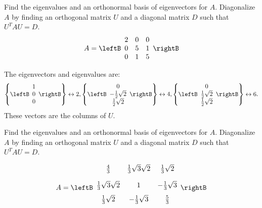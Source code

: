 \begin{enumialphparenastyle}
\begin{ex} Find the eigenvalues and an orthonormal basis of eigenvectors for $A.$
Diagonalize $A$ by finding an orthogonal matrix $U$ and a diagonal matrix $D$
such that $U^{T}AU=D$. 
\begin{equation*}
A=\leftB 
\begin{array}{rrr}
2 & 0 & 0 \\ 
0 & 5 & 1 \\ 
0 & 1 & 5
\end{array}
\rightB 
\end{equation*}
\begin{sol}
The eigenvectors and eigenvalues are:
\[
\left\{ \leftB
\begin{array}{c}
1 \\
0 \\
0
\end{array}
\rightB \right\} \leftrightarrow 2,\left\{ \leftB
\begin{array}{c}
0 \\
-\frac{1}{2}\sqrt{2} \\
\frac{1}{2}\sqrt{2}
\end{array}
\rightB \right\} \leftrightarrow 4,\left\{ \leftB
\begin{array}{c}
0 \\
\frac{1}{2}\sqrt{2} \\
\frac{1}{2}\sqrt{2}
\end{array}
\rightB \right\} \leftrightarrow 6.
\]
These vectors are the columns of $U$.
\end{sol}
\end{ex}

\begin{ex} Find the eigenvalues and an orthonormal basis of eigenvectors for $A.$
Diagonalize $A$ by finding an orthogonal matrix $U$ and a diagonal matrix $D$
such that $U^{T}AU=D$.

\begin{equation*}
A=\leftB 
\begin{array}{ccc}
\vspace{0.05in}\frac{4}{3} & \vspace{0.05in}\frac{1}{3}\sqrt{3}\sqrt{2} & 
\vspace{0.05in}\frac{1}{3}\sqrt{2} \\ 
\vspace{0.05in}\frac{1}{3}\sqrt{3}\sqrt{2} & 1 & -\vspace{0.05in}\frac{1}{3}
\sqrt{3} \\ 
\vspace{0.05in}\frac{1}{3}\sqrt{2} & -\vspace{0.05in}\frac{1}{3}\sqrt{3} & 
\vspace{0.05in}\frac{5}{3}
\end{array}
\rightB
\end{equation*}


\end{ex}
\end{enumialphparenastyle}
